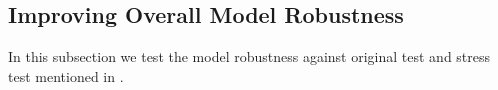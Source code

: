 %		
%			



\subsection{Improving Overall Model Robustness}
In this subsection we test the model robustness against original test and 
stress test mentioned in .
\label{sec:robust}


